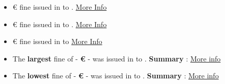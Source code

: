 \documentclass[12pt]{article}
\begin{document}
\newpage
\justify
	\begin{multicols}{2}
		\begin{itemize}
			\item \textbf{} \newline
			€ fine issued in  to .
			\newline
			\newline
			\href{\VAR{new1_link}}{More Info}
			\vspace{1cm}
	
			\item \textbf{} \newline
			€ fine issued in  to .
			\newline
			\newline
			\href{\VAR{new2_link}}{More Info}
			\vspace{1cm}
	
			\item \textbf{} \newline {}€ fine issued in  to 
			\newline
			\newline
			\href{\VAR{new3_link}}{More Info}
		\end{itemize}
	\end{multicols}

\newpage
\justify
	\begin{multicols}{2}
	\begin{itemize}
		\item The \textbf{largest} fine of  - \textbf{ €} - was issued in  to .
		\newline
		\textbf{Summary} : 
		\newline
		\href{\VAR{largest_fine_link}}{More info}
		\vspace{1cm}
	
		\item The \textbf{lowest} fine of  - \textbf{ €} - was issued in  to .
		\newline
		\textbf{Summary} : 
		\newline
		\href{\VAR{lowest_fine_link}}{More info}
	\end{itemize}
	\end{multicols}
\end{document}
